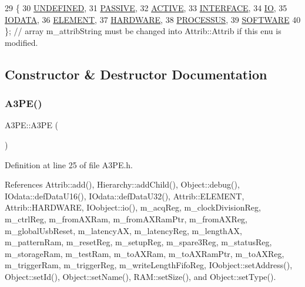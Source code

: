 \begin{DoxyCode}
29                 \{
30     \hyperlink{classAttrib_a69e171d7cc6417835a5a306d3c764235a3a8da2ab97dda18aebab196fe4100531}{UNDEFINED},
31     \hyperlink{classAttrib_a69e171d7cc6417835a5a306d3c764235a2bfb2af57b87031d190a05fe25dd92ed}{PASSIVE},
32     \hyperlink{classAttrib_a69e171d7cc6417835a5a306d3c764235a3b1fec929c0370d1436f2f06e298fb0d}{ACTIVE},
33     \hyperlink{classAttrib_a69e171d7cc6417835a5a306d3c764235aa27c16b480a369ea4d18b07b2516bbc7}{INTERFACE},
34     \hyperlink{classAttrib_a69e171d7cc6417835a5a306d3c764235a1420a5b8c0540b2af210b6975eded7f9}{IO},
35     \hyperlink{classAttrib_a69e171d7cc6417835a5a306d3c764235a0af3b0d0ac323c1704e6c69cf90add28}{IODATA},
36     \hyperlink{classAttrib_a69e171d7cc6417835a5a306d3c764235a7788bc5dd333fd8ce18562b269c9dab1}{ELEMENT},
37     \hyperlink{classAttrib_a69e171d7cc6417835a5a306d3c764235a61ceb22149f365f1780d18f9d1459423}{HARDWARE},
38     \hyperlink{classAttrib_a69e171d7cc6417835a5a306d3c764235a75250e29692496e73effca2c0330977f}{PROCESSUS},
39     \hyperlink{classAttrib_a69e171d7cc6417835a5a306d3c764235a103a67cd0b8f07ef478fa45d4356e27b}{SOFTWARE} 
40   \}; \textcolor{comment}{// array m\_attribString must be changed into Attrib::Attrib if this enu is modified. }
\end{DoxyCode}


\subsection{Constructor \& Destructor Documentation}
\mbox{\label{classA3PE_ae3e49a43c661f5e9c1b0edaee14fc297}} 
\subsubsection{\texorpdfstring{A3\+P\+E()}{A3PE()}}
{\footnotesize\ttfamily A3\+P\+E\+::\+A3\+PE (\begin{DoxyParamCaption}{ }\end{DoxyParamCaption})\hspace{0.3cm}{\ttfamily [inline]}}



Definition at line 25 of file A3\+P\+E.\+h.



References Attrib\+::add(), Hierarchy\+::add\+Child(), Object\+::debug(), I\+Odata\+::def\+Data\+U16(), I\+Odata\+::def\+Data\+U32(), Attrib\+::\+E\+L\+E\+M\+E\+NT, Attrib\+::\+H\+A\+R\+D\+W\+A\+RE, I\+Oobject\+::io(), m\+\_\+acq\+Reg, m\+\_\+clock\+Division\+Reg, m\+\_\+ctrl\+Reg, m\+\_\+from\+A\+X\+Ram, m\+\_\+from\+A\+X\+Ram\+Ptr, m\+\_\+from\+A\+X\+Reg, m\+\_\+global\+Usb\+Reset, m\+\_\+latency\+AX, m\+\_\+latency\+Reg, m\+\_\+length\+AX, m\+\_\+pattern\+Ram, m\+\_\+reset\+Reg, m\+\_\+setup\+Reg, m\+\_\+spare3\+Reg, m\+\_\+status\+Reg, m\+\_\+storage\+Ram, m\+\_\+test\+Ram, m\+\_\+to\+A\+X\+Ram, m\+\_\+to\+A\+X\+Ram\+Ptr, m\+\_\+to\+A\+X\+Reg, m\+\_\+trigger\+Ram, m\+\_\+trigger\+Reg, m\+\_\+write\+Length\+Fifo\+Reg, I\+Oobject\+::set\+Address(), Object\+::set\+Id(), Object\+::set\+Name(), R\+A\+M\+::set\+Size(), and Object\+::set\+Type().


